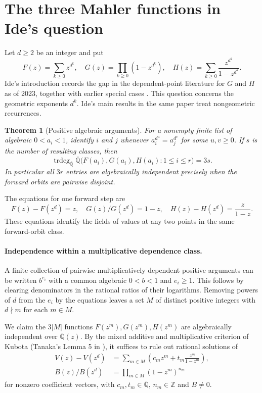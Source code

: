 \documentclass[11pt,a4paper]{article}
\newtheorem{theorem}{Theorem}[section]
\theoremstyle{definition}
\theoremstyle{remark}
\numberwithin{equation}{section}
\begin{document}
\section{The three Mahler functions in Ide's question}
\label{sec:ide}
Let $d\ge2$ be an integer and put
\[
 F(z)=\sum_{k\ge0}z^{d^k},\quad
 G(z)=\prod_{k\ge0}(1-z^{d^k}),\quad
 H(z)=\sum_{k\ge0}\frac{z^{d^k}}{1-z^{d^k}} .
\]
Ide's introduction records the gap in the dependent-point literature for $G$ and $H$ as of 2023, together with earlier special cases \cite{IdeGeometric}. This question concerns the geometric exponents $d^k$. Ide's main results in the same paper treat nongeometric recurrences.

\begin{theorem}[Positive algebraic arguments]\label{thm:ide}
For a nonempty finite list of algebraic $0<a_i<1$, identify $i$ and $j$ whenever $a_i^{d^u}=a_j^{d^v}$ for some $u,v\ge0$. If $s$ is the number of resulting classes, then
\[
 \operatorname{trdeg}_{\overline{\mathbb Q}}
 \overline{\mathbb Q}\bigl(F(a_i),G(a_i),H(a_i):1\le i\le r\bigr)=3s.
\]
In particular all $3r$ entries are algebraically independent precisely when the forward orbits are pairwise disjoint.
\end{theorem}
The equations for one forward step are
\[
 F(z)-F(z^d)=z,\quad G(z)/G(z^d)=1-z,\quad
 H(z)-H(z^d)=\frac{z}{1-z}.
\]
These equations identify the fields of values at any two points in the same forward-orbit class.

\paragraph{Independence within a multiplicative dependence class.}
A finite collection of pairwise multiplicatively dependent positive arguments can be written $b^{e_i}$ with a common algebraic $0<b<1$ and $e_i\ge1$. This follows by clearing denominators in the rational ratios of their logarithms. Removing powers of $d$ from the $e_i$ by the equations leaves a set $M$ of distinct positive integers with $d\nmid m$ for each $m\in M$.

We claim the $3|M|$ functions $F(z^m),G(z^m),H(z^m)$ are algebraically independent over $\overline{\mathbb Q}(z)$. By the mixed additive and multiplicative criterion of Kubota (Tanaka's Lemma 5 in \cite{TanakaGeom}), it suffices to rule out rational solutions of
\begin{align*}
 V(z)-V(z^d)&=\sum_{m\in M}\left(c_m z^m+t_m\frac{z^m}{1-z^m}\right),\\
 B(z)/B(z^d)&=\prod_{m\in M}(1-z^m)^{n_m}
\end{align*}
for nonzero coefficient vectors, with $c_m,t_m\in\overline{\mathbb Q}$, $n_m\in\mathbb Z$ and $B\ne0$.
\end{document}
